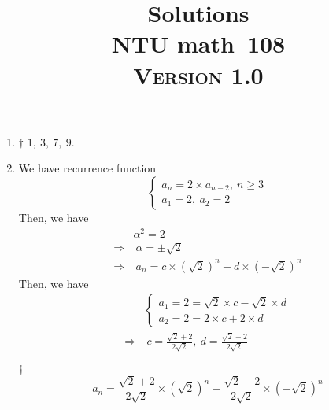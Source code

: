 \documentclass[a4paper,12pt]{article}
\newcommand{\school}{ntu}
\newcommand{\subject}{math}
\renewcommand{\year}{108}
\newcommand{\titlename}{\MakeUppercase{\school} \subject \ \year}
\newcommand{\ver}{\textsc{Version} 1.0} %
\begin{document}
\title{\LARGE{\textbf{Solutions}} \\
	\Huge{\textbf{\titlename}} \\
	\normalsize{\ver}
}
\author{}
\date{}

\maketitle


\begin{enumerate}
	\item \begin{answer}{$\dag$} $1, \ 3, \ 7, \ 9$.
    \end{answer}
    \item We have recurrence function \begin{equation}
        \begin{cases}
            a_n = 2 \times a_{n - 2}, \ n \ge 3 \\
            a_1 = 2, \ a_2 = 2
        \end{cases}
    \end{equation} Then, we have \begin{equation}
        \begin{aligned}
            & \alpha^2 = 2 \\
            \Rightarrow & \ \alpha = \pm \sqrt{2} \\
            \Rightarrow & \ a_n = c \times (\sqrt{2})^n + d \times (-\sqrt{2})^n
        \end{aligned}
    \end{equation} Then, we have \begin{equation}
        \begin{aligned}
            & \begin{cases}
                a_1 = 2 = \sqrt{2} \times c - \sqrt{2} \times d \\
                a_2 = 2 = 2 \times c + 2 \times d
            \end{cases} \\
            \Rightarrow & \ c = \frac{\sqrt{2} + 2}{2\sqrt{2}}, \ d = \frac{\sqrt{2} - 2}{2\sqrt{2}}
        \end{aligned}
    \end{equation}
    \begin{answer}{$\dag$}\begin{equation}
            a_n = \frac{\sqrt{2} + 2}{2\sqrt{2}} \times (\sqrt{2})^n + \frac{\sqrt{2} - 2}{2\sqrt{2}} \times (-\sqrt{2})^n

\end{equation}
\end{answer}
\end{enumerate}
\end{document}
